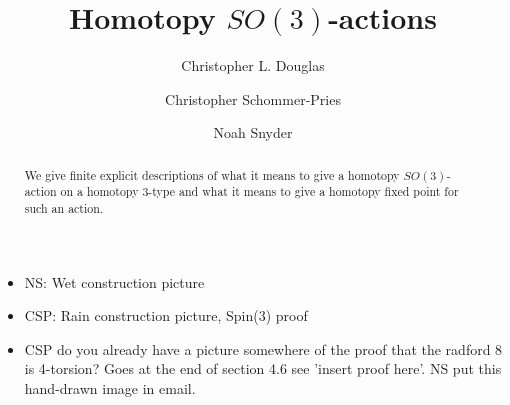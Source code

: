 \documentclass{amsart}
\begin{document}
\title{Homotopy $SO(3)$-actions}

\author{Christopher L. Douglas}
\address{Mathematical Institute\\ University of Oxford\\ Oxford OX1 3LB\\ United Kingdom}
      	
\author{Christopher Schommer-Pries}
\address{Department of Mathematics\\ University of Notre Dame \\ Notre Dame, IN 46556\\ USA}

\author{Noah Snyder}
\address{Department of Mathematics\\ Indiana University\\ Bloomington, IN 47405\\ USA}


\begin{abstract}
We give finite explicit descriptions of what it means to give a homotopy $SO(3)$-action on a homotopy $3$-type and what it means to give a homotopy fixed point for such an action.
\end{abstract}

\maketitle

\tikzexternaldisable

\tableofcontents



\begin{itemize}
\item NS: Wet construction picture
\item CSP: Rain construction picture, Spin(3) proof
\item CSP do you already have a picture somewhere of the proof that the radford 8 is 4-torsion? Goes at the end of section 4.6 see 'insert proof here'. NS put this hand-drawn image in email.
\end{itemize}
\end{document}
